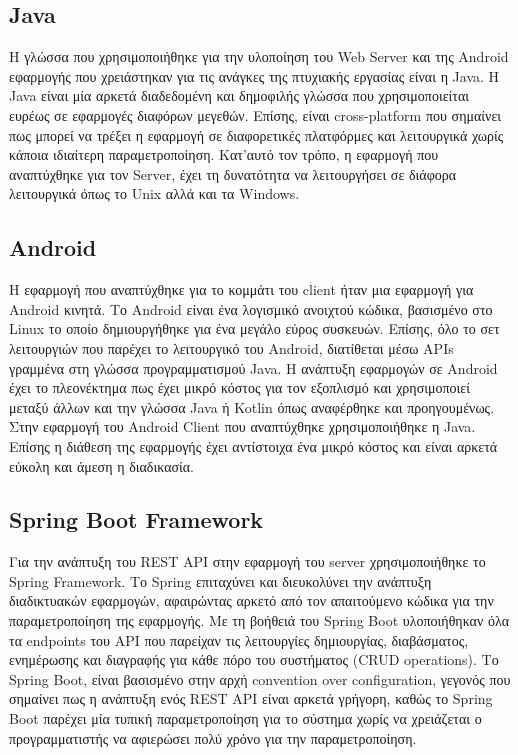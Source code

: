 \documentclass[oneside, 12pt]{book}
\begin{document}
\subsection{Java} 
Η γλώσσα που χρησιμοποιήθηκε για την υλοποίηση του 
Web Server και της Android εφαρμογής που χρειάστηκαν για τις ανάγκες 
της πτυχιακής εργασίας είναι η Java. Η Java είναι μία 
αρκετά διαδεδομένη και δημοφιλής γλώσσα που χρησιμοποιείται ευρέως σε 
εφαρμογές διαφόρων μεγεθών. Επίσης, είναι cross-platform που σημαίνει 
πως μπορεί να τρέξει η εφαρμογή σε διαφορετικές πλατφόρμες και 
λειτουργικά χωρίς κάποια ιδιαίτερη παραμετροποίηση. Κατ'αυτό τον τρόπο, η εφαρμογή που αναπτύχθηκε για τον Server, έχει τη δυνατότητα να λειτουργήσει σε διάφορα λειτουργικά όπως το Unix αλλά και τα Windows.

\subsection{Android} Η εφαρμογή που αναπτύχθηκε για το κομμάτι του 
client ήταν μια εφαρμογή για Android κινητά. Το Android είναι ένα 
λογισμικό  ανοιχτού κώδικα, βασισμένο στο Linux το οποίο 
δημιουργήθηκε για ένα μεγάλο εύρος συσκευών. Επίσης, όλο το σετ 
λειτουργιών που παρέχει το λειτουργικό του Android, διατίθεται μέσω 
APIs γραμμένα στη γλώσσα προγραμματισμού Java.
\cite{android_platform}
Η ανάπτυξη εφαρμογών σε Android έχει το πλεονέκτημα πως έχει μικρό 
κόστος για τον εξοπλισμό και χρησιμοποιεί μεταξύ άλλων και την γλώσσα 
Java ή Kotlin όπως αναφέρθηκε και προηγουμένως. 
Στην εφαρμογή του Android Client που αναπτύχθηκε χρησιμοποιήθηκε η 
Java. Επίσης η διάθεση της εφαρμογής έχει αντίστοιχα ένα μικρό κόστος 
και είναι αρκετά εύκολη και άμεση η διαδικασία.

\subsection{Spring Boot Framework} Για την ανάπτυξη του REST API στην 
εφαρμογή του server χρησιμοποιήθηκε το Spring Framework.
Το Spring επιταχύνει και διευκολύνει την ανάπτυξη διαδικτυακών 
εφαρμογών, αφαιρώντας αρκετό από τον απαιτούμενο κώδικα για την 
παραμετροποίηση της εφαρμογής.
Με τη βοήθειά του Spring Boot υλοποιήθηκαν όλα τα endpoints του API που παρείχαν τις λειτουργίες δημιουργίας, 
διαβάσματος, ενημέρωσης και διαγραφής για κάθε πόρο του συστήματος 
(CRUD operations). Το Spring Boot, είναι βασισμένο στην αρχή 
convention over configuration, γεγονός που σημαίνει πως η ανάπτυξη 
ενός REST API είναι αρκετά γρήγορη, καθώς το Spring Boot παρέχει μία 
τυπική παραμετροποίηση για το σύστημα χωρίς να χρειάζεται ο 
προγραμματιστής να αφιερώσει πολύ χρόνο για την παραμετροποίηση.
\end{document}
